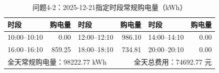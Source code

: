 \begin{table}[H]\centering\small
\caption{问题4-2：2025-12-21指定时段常规购电量（kWh）}
\label{tab:q4_2_1221_purchase}
\begin{tabular}{lrlrlr}\toprule
时段 & 购电量 & 时段 & 购电量 & 时段 & 购电量 \\\midrule
10:00--10:10 & 0.00 & 12:00--12:10 & 986.10 & 14:00--14:10 & 0.00 \\
16:00--16:10 & 859.25 & 18:00--18:10 & 734.81 & 20:00--20:10 & 0.00 \\
\midrule
\multicolumn{3}{l}{全天常规购电量：98222.77 kWh} & \multicolumn{3}{r}{全天总费用：74692.77 元}\\
\bottomrule\end{tabular}\end{table}
